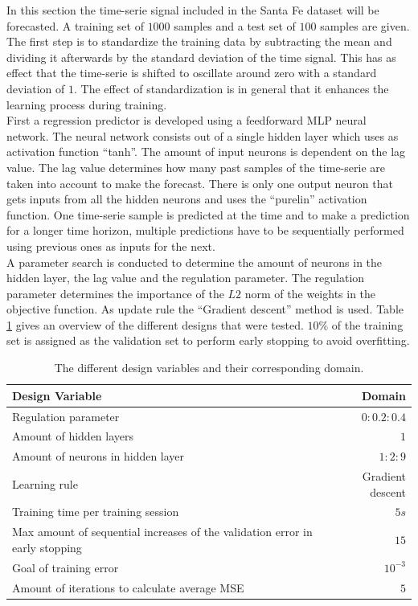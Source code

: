 \documentclass[a4paper,10pt]{article}
\begin{document}
In this section the time-serie  signal included in the Santa Fe dataset will be forecasted. A training set of $ 1000 $ samples and a test set of $ 100 $ samples are given. The first step is to standardize the training data by subtracting the mean and dividing it afterwards by the standard deviation of the time signal. This has as effect that the time-serie is shifted to oscillate around zero with a standard deviation of $ 1 $. The effect of standardization is in general that it enhances the learning process during training. \\
First a regression predictor is developed using a feedforward MLP neural network. The neural network consists out of a single hidden layer which uses as activation function ``tanh''. The amount of input neurons is dependent on the lag value. The lag value determines how many past samples of the time-serie are taken into account to make the forecast. There is only one output neuron that gets inputs from all the hidden neurons and uses the ``purelin'' activation function. One time-serie sample is predicted at the time and to make a prediction for a longer time horizon, multiple predictions have to be sequentially performed using previous ones as inputs for the next.\\

A parameter search is conducted to determine the amount of neurons in the hidden layer, the lag value and the regulation parameter. The regulation parameter determines the importance of the $ L2 $ norm of the weights in the objective function. As update rule the ``Gradient descent'' method is used. Table \ref{tab:design} gives an overview of the different designs that were tested. $ 10\% $ of the training set is assigned as the validation set to perform early stopping to avoid overfitting.\\

\begin{table}
	\centering
	\begin{tabular}{@{}lr@{}} \toprule
		\textbf{Design Variable}    & Domain \\\midrule
		Regulation parameter & $ 0:0.2:0.4 $ \\ 
		Amount of hidden layers & $ 1 $\\
		Amount of neurons in hidden layer & $ 1:2:9 $  \\
		Learning rule & Gradient descent\\
		Training time per training session & $ 5 s $\\
		Max amount of sequential increases of the validation error in early stopping & $ 15 $\\
		Goal of training error & $ 10^{-3} $\\
		Amount of iterations to calculate average MSE & $ 5 $\\\bottomrule
	\end{tabular}
	\caption{The different design variables and their corresponding domain.}
	\label{tab:design}
\end{table}  
\end{document}

